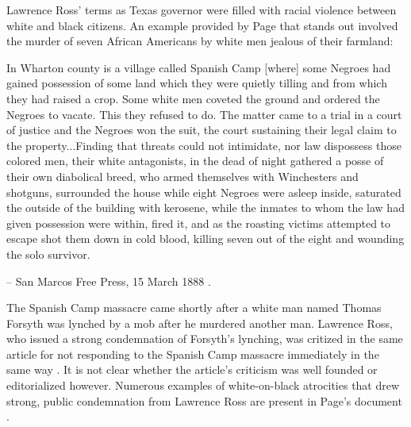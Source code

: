 \documentclass[12pt]{article}
\begin{document}
Lawrence Ross' terms as Texas governor were filled with racial violence between white and black citizens. An example provided by Page that stands out involved the murder of seven African Americans by white men jealous of their farmland:
\begin{displayquote}
In Wharton county is a village called Spanish Camp [where] some Negroes had gained possession of some land which they were quietly tilling and from which they had raised a crop. Some white men coveted the ground and ordered the Negroes to vacate.  This they refused to do. The matter came to a trial in a court of justice and the Negroes won the suit, the court sustaining their legal claim to the property...Finding that threats could not intimidate, nor law dispossess those colored men, their white antagonists, in the dead of night gathered a posse of their own diabolical breed, who armed themselves with Winchesters and shotguns, surrounded the house while eight Negroes were asleep inside, saturated the outside of the building with kerosene, while the inmates to whom the law had given possession were within, fired it, and as the roasting victims attempted to escape shot them down in cold blood, killing seven out of the eight and wounding the solo survivor.

-- San Marcos Free Press, 15 March 1888 \cite{sanmarcospress}.
\end{displayquote}

The Spanish Camp massacre came shortly after a white man named Thomas Forsyth was lynched by a mob after he murdered another man. Lawrence Ross, who issued a strong condemnation of Forsyth's lynching, was critized in the same article for not responding to the Spanish Camp massacre immediately in the same way \cite[pg. 97--98]{page}. It is not clear whether the article's criticism was well founded or editorialized however. Numerous examples of white-on-black atrocities that drew strong, public condemnation from Lawrence Ross are present in Page's document \cite[95--155, etc]{page}. 
\end{document}
